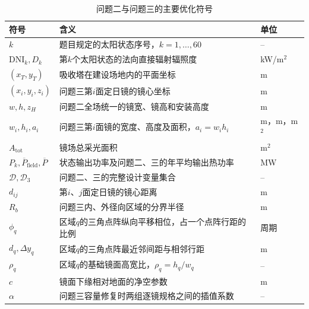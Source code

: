 \begin{table}[H]
\centering
\caption{问题二与问题三的主要优化符号}
\begin{tabularx}{\textwidth}{>{\centering\arraybackslash}p{}L>{\centering\arraybackslash}p{0.14\textwidth}}
\toprule
符号 & 含义 & 单位 \\
\midrule
$k$ & 题目规定的太阳状态序号，$k=1,\ldots,60$ & -- \\
$\mathrm{DNI}_k,D_k$ & 第$k$个太阳状态的法向直接辐射辐照度 & kW/m$^2$ \\
$(x_T,y_T)$ & 吸收塔在建设场地内的平面坐标 & m \\
$(x_i,y_i,z_i)$ & 问题三第$i$面定日镜的镜心坐标 & m \\
$w,h,z_H$ & 问题二全场统一的镜宽、镜高和安装高度 & m \\
$w_i,h_i,a_i$ & 问题三第$i$面镜的宽度、高度及面积，$a_i=w_ih_i$ & m，m，m$^2$ \\
$A_{\mathrm{tot}}$ & 镜场总采光面积 & m$^2$ \\
$P_k,\overline P_{\mathrm{field}},\overline P$ & 状态输出功率及问题二、三的年平均输出热功率 & MW \\
$\mathcal D,\mathcal D_3$ & 问题二、三的完整设计变量集合 & -- \\
$d_{ij}$ & 第$i$、$j$面定日镜的镜心距离 & m \\
$R_b$ & 问题三内、外径向区域的分界半径 & m \\
$\phi_q$ & 区域$q$的三角点阵纵向平移相位，占一个点阵行距的比例 & 周期 \\
$d_q,\Delta y_q$ & 区域$q$的三角点阵最近邻间距与相邻行距 & m \\
$\rho_q$ & 区域$q$的基础镜面高宽比，$\rho_q=h_q/w_q$ & -- \\
$c$ & 镜面下缘相对地面的净空参数 & m \\
$\alpha$ & 问题三容量修复时两组逐镜规格之间的插值系数 & -- \\
\bottomrule
\end{tabularx}
\end{table}
